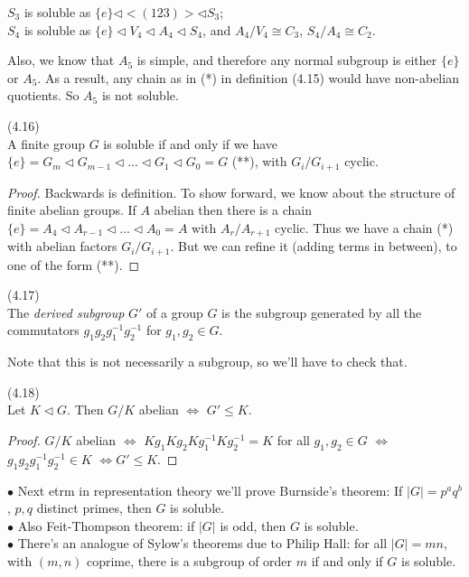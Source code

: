 \documentclass[a4paper]{article}
\begin{document}
\begin{eg}
$S_3$ is soluble as $\{e\} \triangleleft <(123)> \triangleleft S_3$;\\
$S_4$ is soluble as $\{e\} \triangleleft V_4 \triangleleft A_4 \triangleleft S_4$, and $A_4/V_4 \cong C_3$, $S_4 / A_4 \cong C_2$.

Also, we know that $A_5$ is simple, and therefore any normal subgroup is either $\{e\}$ or $A_5$. As a result, any chain as in (*) in definition (4.15) would have non-abelian quotients. So $A_5$ is not soluble.
\end{eg}

\begin{lemma} (4.16)\\
A finite group $G$ is soluble if and only if we have $\{e\} = G_m \triangleleft G_{m-1} \triangleleft ... \triangleleft G_1 \triangleleft G_0 = G$ (**), with $G_i/G_{i+1}$ cyclic.
\begin{proof}
Backwards is definition. To show forward, we know about the structure of finite abelian groups. If $A$ abelian then there is a chain $\{e\} = A_4 \triangleleft A_{r-1} \triangleleft ... \triangleleft A_0 = A$ with $A_r /A_{r+1}$ cyclic. Thus we have a chain (*) with abelian factors $G_i / G_{i+1}$. But we can refine it (adding terms in between), to one of the form (**).
\end{proof}
\end{lemma}

\begin{defi} (4.17)\\
The \emph{derived subgroup} $G'$ of a group $G$ is the subgroup generated by all the commutators $g_1g_2g_1^{-1}g_2^{-1}$ for $g_1,g_2 \in G$.

Note that this is not necessarily a subgroup, so we'll have to check that.
\end{defi}

\begin{lemma} (4.18)\\
Let $K \triangleleft G$. Then $G/K$ abelian $\iff$ $G' \leq K$.
\begin{proof}
$G/K$ abelian $\iff$ $Kg_1 Kg_2 Kg_1^{-1} Kg_2^{-1} = K$ for all $g_1,g_2 \in G$ $\iff$ $g_1g_2g_1^{-1} g_2^{-1} \in K$ $\iff G' \leq K$.
\end{proof}
\end{lemma}

\begin{rem}
$\bullet$ Next etrm in representation theory we'll prove Burnside's theorem: If $|G| = p^a q^b$, $p,q$ distinct primes, then $G$ is soluble.\\
$\bullet$ Also Feit-Thompson theorem: if $|G|$ is odd, then $G$ is soluble.\\
$\bullet$ There's an analogue of Sylow's theorems due to Philip Hall: for all $|G| = mn$, with $(m,n)$ coprime, there is a subgroup of order $m$ if and only if $G$ is soluble.
\end{rem}
\end{document}

